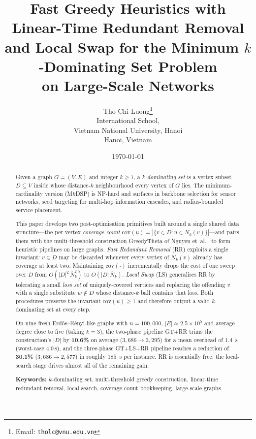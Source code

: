 \documentclass[11pt,a4paper]{article}
\title{%
  Fast Greedy Heuristics with Linear-Time Redundant Removal\\
  and Local Swap for the Minimum $k$-Dominating Set Problem\\
  on Large-Scale Networks%
}
\author{
  Tho Chi Luong\thanks{Email: \texttt{tholc@vnu.edu.vn}}
  \\[6pt]
  International School,\\
  Vietnam National University, Hanoi\\
  Hanoi, Vietnam
}
\date{\today}
\newcommand{\Nk}{\overline{N}_k}
\newcommand{\cov}{\mathrm{cov}}
\begin{document}
\maketitle

\begin{abstract}
Given a graph $G=(V,E)$ and integer $k\ge 1$, a \emph{$k$-dominating
set} is a vertex subset $D\subseteq V$ inside whose
distance-$k$ neighbourhood every vertex of $G$ lies. The
minimum-cardinality version (M$k$DSP) is NP-hard and surfaces in
backbone selection for sensor networks, seed targeting for multi-hop
information cascades, and radius-bounded service placement.

This paper develops two post-optimisation primitives built around a
single shared data structure—the per-vertex \emph{coverage count}
$\cov(u)=|\{v\in D:u\in N_k(v)\}|$—and pairs them with the
multi-threshold construction GreedyTheta of
Nguyen et~al.~\cite{nguyen2020} to form heuristic pipelines on
large graphs. \emph{Fast Redundant Removal} (RR) exploits a single
invariant: $v\in D$ may be discarded whenever every vertex of
$N_k(v)$ already has coverage at least two. Maintaining
$\cov(\cdot)$ incrementally drops the cost of one sweep over $D$
from $O(|D|^2\,\Nk^2)$ to $O(|D|\,\Nk)$. \emph{Local Swap} (LS)
generalises RR by tolerating a small \emph{loss set} of
uniquely-covered vertices and replacing the offending $v$ with a
single substitute $w\notin D$ whose distance-$k$ ball contains that
loss. Both procedures preserve the invariant $\cov(u)\ge 1$ and
therefore output a valid $k$-dominating set at every step.

On nine fresh Erd\H{o}s--R\'enyi-like graphs with $n=100{,}000$,
$|E|\approx 2.5\times 10^5$ and average degree close to five (taking
$k=3$), the two-phase pipeline GT$+$RR trims the construction's
$|D|$ by \textbf{10.6\%} on average ($3{,}686\to 3{,}295$) for a mean
overhead of $1.4$~s (worst-case $4.0$\,s), and the three-phase
GT$+$LS$+$RR pipeline reaches a reduction of \textbf{30.1\%}
($3{,}686\to 2{,}577$) in roughly $185$~s per instance. RR is
essentially free; the local-search stage drives almost all of the
remaining gain.

\medskip\noindent
\textbf{Keywords:}
$k$-dominating set, multi-threshold greedy construction, linear-time
redundant removal, local search, coverage-count bookkeeping,
large-scale graphs.
\end{abstract}
\end{document}
